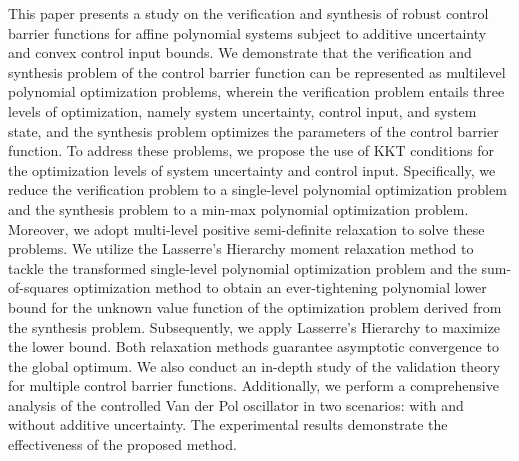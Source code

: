 \begin{abstract*}
  This paper presents a study on the verification and synthesis of robust control barrier functions for affine polynomial systems subject to additive uncertainty and convex control input bounds. We demonstrate that the verification and synthesis problem of the control barrier function can be represented as multilevel polynomial optimization problems, wherein the verification problem entails three levels of optimization, namely system uncertainty, control input, and system state, and the synthesis problem optimizes the parameters of the control barrier function. To address these problems, we propose the use of KKT conditions for the optimization levels of system uncertainty and control input. Specifically, we reduce the verification problem to a single-level polynomial optimization problem and the synthesis problem to a min-max polynomial optimization problem. Moreover, we adopt multi-level positive semi-definite relaxation to solve these problems. We utilize the Lasserre's Hierarchy moment relaxation method to tackle the transformed single-level polynomial optimization problem and the sum-of-squares optimization method to obtain an ever-tightening polynomial lower bound for the unknown value function of the optimization problem derived from the synthesis problem. Subsequently, we apply Lasserre's Hierarchy to maximize the lower bound. Both relaxation methods guarantee asymptotic convergence to the global optimum. We also conduct an in-depth study of the validation theory for multiple control barrier functions. Additionally, we perform a comprehensive analysis of the controlled Van der Pol oscillator in two scenarios: with and without additive uncertainty. The experimental results demonstrate the effectiveness of the proposed method.

\end{abstract*}
